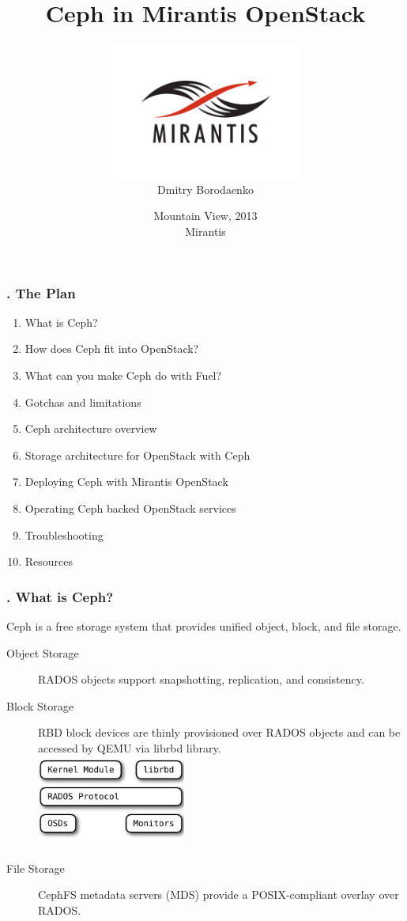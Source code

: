 \documentclass[hyperref=unicode,utf8,xcolor=pst]{beamer}
\title{Ceph in Mirantis OpenStack}
\author{\includegraphics[height=4.5cm]{Vector_RGB_MirantisLogo}\\Dmitry Borodaenko}
\date{Mountain View, 2013\\ Mirantis}
\begin{document}
\begin{frame}
	\titlepage
\end{frame}

\begin{frame}
	\setcounter{framenumber}{1}
	\frametitle{\insertframenumber{}. The Plan}
	\begin{enumerate}
		\item What is Ceph?
		\item How does Ceph fit into OpenStack?
		\item What can you make Ceph do with Fuel?
		\item Gotchas and limitations
		\item Ceph architecture overview
		\item Storage architecture for OpenStack with Ceph
		\item Deploying Ceph with Mirantis OpenStack
		\item Operating Ceph backed OpenStack services
		\item Troubleshooting
		\item Resources
	\end{enumerate}
\end{frame}

\begin{frame}
	\frametitle{\insertframenumber{}. What is Ceph?}
	Ceph is a free storage system that provides unified object,
	block, and file storage.

	\begin{description}
		\item[Object Storage] RADOS objects support
			snapshotting, replication, and consistency.
		\item[Block Storage] RBD block devices are thinly
			provisioned over RADOS objects and can be
			accessed by QEMU via librbd library.\\
			\includegraphics[height=3cm]{ceph-rbd}
		\item[File Storage] CephFS metadata servers (MDS)
			provide a POSIX-compliant overlay over RADOS.
	\end{description}
\end{frame}
\end{document}
